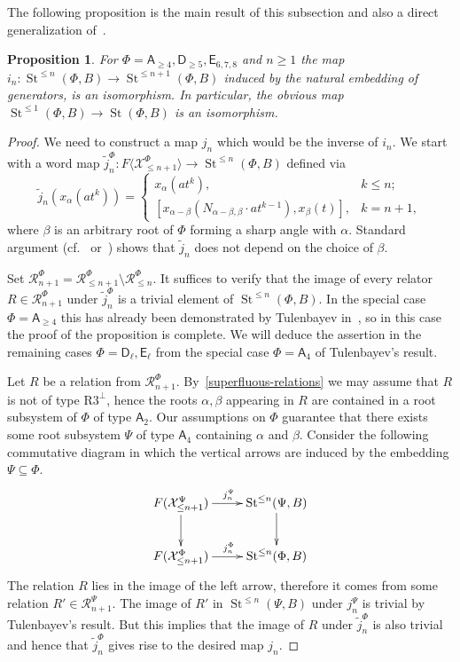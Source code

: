\documentclass[oneside, 8pt]{amsart}
\newtheorem{prop}[lemma]{Proposition}
\theoremstyle{remark}
\theoremstyle{definition}
\numberwithin{lemma}{section}
\numberwithin{prop}{section}
\numberwithin{corollary}{section}
\numberwithin{externaltheorem}{section}
\DeclareMathOperator{\St}{St}
\newcommand{\rA}{\mathsf{A}}
\newcommand{\rD}{\mathsf{D}}
\newcommand{\rE}{\mathsf{E}}
\numberwithin{equation}{section}
\begin{document}
The following proposition is the main result of this subsection and also a direct generalization of~\cite[Lemma~3.3]{Tu83}.
\begin{prop} \label{lemma33} For $\Phi=\rA_{\geq 4}, \rD_{\geq 5}, \rE_{6,7,8}$ and $n \geq 1$ the map $i_n\colon \St^{\leq n}(\Phi, B) \to \St^{\leq n+1}(\Phi, B)$ induced by the natural embedding of generators, is an isomorphism. In particular, the obvious map $\St^{\leq 1}(\Phi, B) \to \St(\Phi, B)$ is an isomorphism. \end{prop}
\begin{proof}
 We need to construct a map $j_n$ which would be the inverse of $i_n$. 
 We start with a word map $\widetilde{j}_n^\Phi \colon F\langle \mathcal{X}^\Phi_{\leq n+1} \rangle \to \St^{\leq n}(\Phi, B)$ defined via
 \[ \widetilde{j}_n(x_\alpha(at^k)) = \begin{cases} x_\alpha(at^k), & k\leq n; \\
      [x_{\alpha - \beta} (N_{\alpha-\beta, \beta} \cdot at^{k-1}), x_{\beta}(t)], & k = n+1, \end{cases} \]
 where $\beta$ is an arbitrary root of $\Phi$ forming a sharp angle with $\alpha$.
 Standard argument (cf.~\cite[Proposition~1.1]{Re75} or~\cite[Proposition~3.2.2]{RS76}) shows that $\widetilde{j}_n$ does not depend on the choice of $\beta$.
 
 Set $\mathcal{R}^\Phi_{n+1} = \mathcal{R}^\Phi_{\leq n+1} \setminus \mathcal{R}^\Phi_{\leq n}$. It suffices to verify that the image of every relator $R \in \mathcal{R}^\Phi_{n+1}$ under $\widetilde{j}^\Phi_n$ is a trivial element of $\St^{\leq n}(\Phi, B)$. In the special case $\Phi=\rA_{\geq 4}$ this has already been demonstrated by Tulenbayev in~\cite[Lemma~3.3]{Tu83}, so in this case the proof of the proposition is complete. We will deduce the assertion in the remaining cases $\Phi=\rD_\ell,\rE_\ell$ from the special case $\Phi=\rA_4$ of Tulenbayev's result.
 
 Let $R$ be a relation from $\mathcal{R}^\Phi_{n+1}$. By~\cref{superfluous-relations} we may assume that $R$ is not of type $\text{R3}^\bot$, hence the roots $\alpha, \beta$ appearing in $R$ are contained in a root subsystem of $\Phi$ of type $\rA_2$. Our assumptions on $\Phi$ guarantee that there exists some root subsystem $\Psi$ of type $\rA_4$ containing $\alpha$ and $\beta$. Consider the following commutative diagram in which the vertical arrows are induced by the embedding $\Psi\subseteq\Phi$. 
  \begin{equation} \nonumber \xymatrix{
 F(\mathcal{X}_{\leq n+1}^\Psi) \ar[r]^{j_n^\Psi} \ar[d] & \St^{\leq n}(\Psi, B) \ar[d] \\
 F(\mathcal{X}_{\leq n+1}^\Phi) \ar[r]^{j_n^\Phi} & \St^{\leq n}(\Phi, B) }
 \end{equation}
The relation $R$ lies in the image of the left arrow, therefore it comes from some relation $R' \in \mathcal{R}^\Psi_{n+1}$. The image of $R'$ in $\St^{\leq n}(\Psi, B)$ under $j_n^\Psi$ is trivial by Tulenbayev's result. But this implies that the image of $R$ under $\widetilde{j}_n^\Phi$ is also trivial and hence that $\widetilde{j}_n^\Phi$ gives rise to the desired map $j_n$.
\end{proof}
\end{document}
